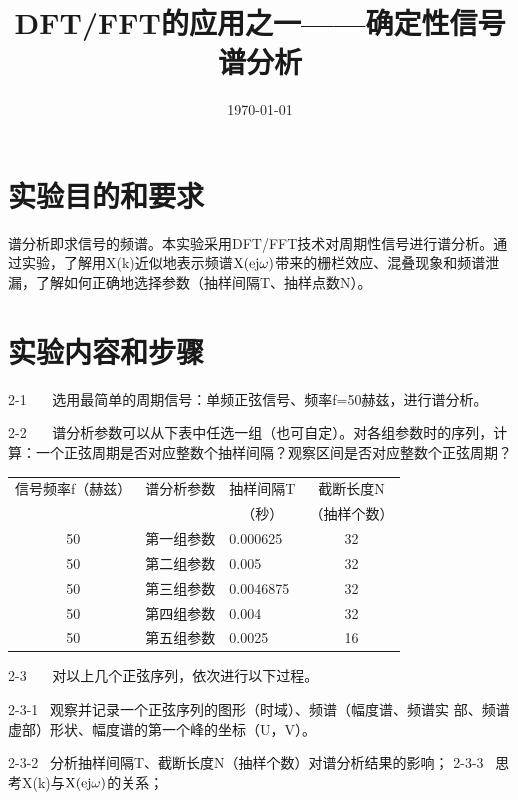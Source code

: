 \documentclass{../source/Experiment copy}
\title{DFT/FFT的应用之一——确定性信号谱分析}
\date{\today}
\begin{document}
    \makeheader
    \section{实验目的和要求}
    谱分析即求信号的频谱。本实验采用DFT/FFT技术对周期性信号进行谱分析。通过实验，了解用X(k)近似地表示频谱$\rm  X(ej\omega)$带来的栅栏效应、混叠现象和频谱泄漏，了解如何正确地选择参数（抽样间隔T、抽样点数N）。

    \section{实验内容和步骤}
    2-1 \,  \,  \, 选用最简单的周期信号：单频正弦信号、频率f=50赫兹，进行谱分析。

    2-2 \,  \,  \, 谱分析参数可以从下表中任选一组（也可自定）。对各组参数时的序列，计算：一个正弦周期是否对应整数个抽样间隔？观察区间是否对应整数个正弦周期？
    \begin{table}[H]
        \centering
        \begin{tabular}{|c|c|l|c|}
        \hline
        {信号频率f（赫兹）} & {谱分析参数} & \multicolumn{1}{c|}{抽样间隔T} & {截断长度N} \\
        {}          & {}      & \multicolumn{1}{c|}{（秒）}            & （抽样个数）         \\ \hline
        50                 & 第一组参数          & 0.000625                            & 32             \\ \hline
        50                 & 第二组参数          & 0.005                               & 32             \\ \hline
        50                 & 第三组参数          & 0.0046875                           & 32             \\ \hline
        50                 & 第四组参数          & 0.004                               & 32             \\ \hline
        50                 & 第五组参数          & 0.0025                              & 16             \\ \hline
        \end{tabular}
    \end{table}
    2-3 \,  \,  \, 对以上几个正弦序列，依次进行以下过程。

    2-3-1 \, 观察并记录一个正弦序列的图形（时域）、频谱（幅度谱、频谱实 部、频谱虚部）形状、幅度谱的第一个峰的坐标（U，V）。

    2-3-2 \, 分析抽样间隔T、截断长度N（抽样个数）对谱分析结果的影响；
    2-3-3 \, 思考X(k)与$\rm  X(ej\omega)$的关系；
\end{document}
